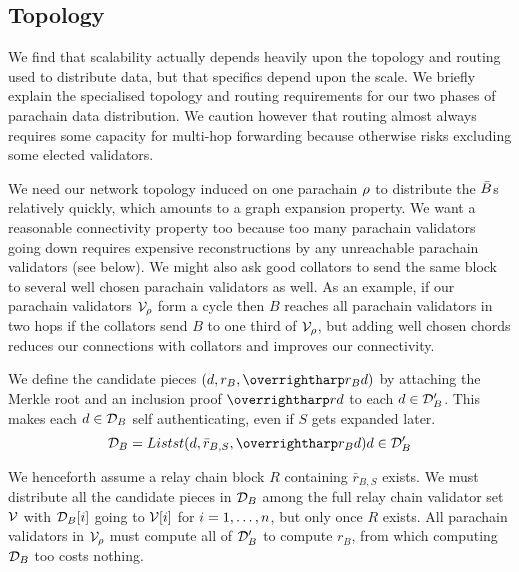 \subsection{Topology}

We find that scalability actually depends heavily upon the topology and routing used to distribute data, but that specifics depend upon the scale.  We briefly explain the specialised topology and routing requirements for our two phases of parachain data distribution.  We caution however that routing almost always requires some capacity for multi-hop forwarding because otherwise risks excluding some elected validators.  

\smallskip

We need our network topology induced on one parachain $\rho$ to distribute the $\bar{B}$s relatively quickly, which amounts to a graph expansion property.  We want a reasonable connectivity property too because too many parachain validators going down requires expensive reconstructions by any unreachable parachain validators (see  below).  We might also ask good collators to send the same block to several well chosen parachain validators as well.  As an example, if our parachain validators $\mathcal{V}_{\rho}$ form a cycle then $B$ reaches all parachain validators in two hops if the collators send $B$ to one third of $\mathcal{V}_{\rho}$, but adding well chosen chords reduces our connections with collators and improves our connectivity.  

\smallskip

We define the candidate pieces $(d,r_B,\vect{r_B d})$ by attaching the Merkle root and an inclusion proof $\vect{rd}$ to each $d \in \mathcal{D}'_B$.  This makes each $d \in \mathcal{D}_B$ self authenticating, even if $S$ gets expanded later.
$$ \pieces_B = Listst{ (d,\bar{r}_{B,S},\vect{r_B d}) }{ d \in \pieces'_B } $$

We henceforth assume a relay chain block $R$ containing $\bar{r}_{B,S}$ exists.  We must distribute all the candidate pieces in $\mathcal{D}_B$ among the full relay chain validator set $\mathcal{V}$ with $\mathcal{D}_B[i]$ going to $\mathcal{V}[i]$ for $i = 1,\ldots,n$, but only once $R$ exists.  All parachain validators in $\mathcal{V}_{\rho}$ must compute all of $\mathcal{D}'_B$ to compute $r_B$, from which computing $\mathcal{D}_B$ too costs nothing.  


